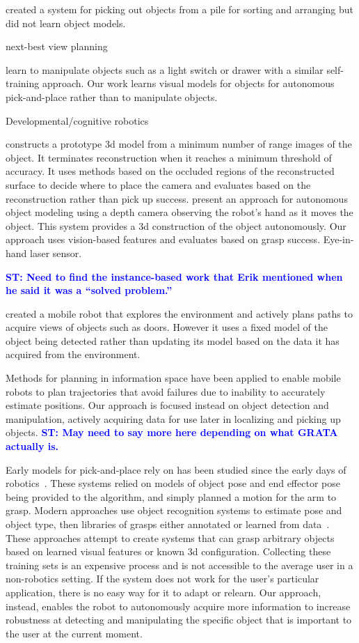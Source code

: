 \documentclass[graybox]{svmult}
\newcommand{\stnote}[1]{\textcolor{blue}{\textbf{ST: #1}}}
\begin{document}
\citet{chang12} created a system for picking out objects from a pile
for sorting and arranging but did not learn object models.  

next-best view planning~\citep{kriegel11}

\citet{nguyen14} learn to manipulate objects such as a light switch or
drawer with a similar self-training approach.  Our work learns visual
models for objects for autonomous pick-and-place rather than to
manipulate objects.

Developmental/cognitive robotics~\citep{lyubova13, kraft10}

\citet{banta00} constructs a prototype 3d model from a minimum number
of range images of the object.  It terminates reconstruction when it
reaches a minimum threshold of accuracy.  It uses methods based on the
occluded regions of the reconstructed surface to decide where to place
the camera and evaluates based on the reconstruction rather than pick
up success.  \citet{krainin11} present an approach for autonomous
object modeling using a depth camera observing the robot's hand as it
moves the object.  This system provides a 3d construction of the
object autonomously.  Our approach uses vision-based features and
evaluates based on grasp success.  Eye-in-hand laser
sensor.~\citep{aleotti14}

\stnote{Need to find the instance-based work that Erik mentioned when
  he said it was a ``solved problem.''}

\citet{velez11} created a mobile robot that explores the environment
and actively plans paths to acquire views of objects such as doors.
However it uses a fixed model of the object being detected rather than
updating its model based on the data it has acquired from the
environment.

Methods for planning in information space \citep{he08, atanasov13,
  prentice09} have been applied to enable mobile robots to plan
trajectories that avoid failures due to inability to accurately
estimate positions.  Our approach is focused instead on
object detection and manipulation, actively acquiring data for use
later in localizing and picking up objects. \stnote{May need to say
  more here depending on what GRATA actually is.}


Early models for pick-and-place rely on has been studied since the
early days of robotics~\citep{brooks83, lozano89}.  These systems
relied on models of object pose and end effector pose being provided to the
algorithm, and simply planned a motion for the arm to grasp.  Modern
approaches use object recognition systems to estimate pose and object
type, then libraries of grasps either annotated or learned from
data~\citep{saxena08, goldfeder09, morales03}.  These approaches
attempt to create systems that can grasp arbitrary objects based on
learned visual features or known 3d configuration.  Collecting these
training sets is an expensive process and is not accessible to the
average user in a non-robotics setting.  If the system does not work
for the user's particular application, there is no easy way for it to
adapt or relearn.  Our approach, instead, enables the robot to
autonomously acquire more information to increase robustness at
detecting and manipulating the specific object that is important to
the user at the current moment.
\end{document}
